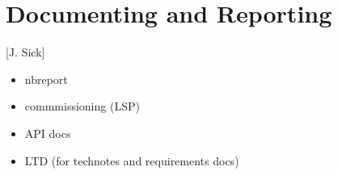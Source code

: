 \section{Documenting and Reporting} [J. Sick]
\begin{itemize}
\item nbreport
\item commmissioning (LSP)
\item API docs
\item LTD (for technotes and requirements docs)
\end{itemize}
